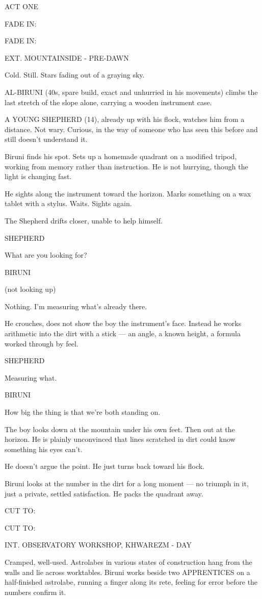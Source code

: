 \documentclass[12pt]{article}
\newcommand{\sceneheading}[1]{%
  \needspace{4\baselineskip}%
  \par\vspace{1\baselineskip}\noindent #1\par\vspace{0.6\baselineskip}%
}
\newcommand{\action}[1]{%
  \par\noindent #1\par\vspace{0.6\baselineskip}%
}
\newcommand{\transition}[1]{%
  \par\vspace{0.3\baselineskip}%
  \ifthenelse{\equal{#1}{FADE IN:}}%
    {\noindent #1\par}%
    {\noindent\hfill #1\par}%
  \vspace{0.6\baselineskip}%
}
\newcommand{\charcue}[1]{%
  \needspace{3\baselineskip}%
  \par\vspace{0.3\baselineskip}\noindent\hspace*{2.2in}#1\par%
}
\newenvironment{dialogue}{%
  \begin{list}{}{%
    \setlength{\leftmargin}{1.1in}%
    \setlength{\rightmargin}{1.6in}%
    \setlength{\listparindent}{0pt}%
    \setlength{\itemindent}{0pt}%
    \setlength{\parsep}{0pt}%
    \setlength{\itemsep}{0pt}%
    \setlength{\topsep}{0pt}%
  }\item[]%
}{%
  \end{list}\vspace{0.4\baselineskip}%
}
\newcommand{\parenthetical}[1]{%
  \hspace*{-0.4in}\hspace*{1.1in}(#1)\par%
}
\newcommand{\actbreak}[1]{%
  \clearpage\thispagestyle{plain}%
  \vspace*{2in}%
  \begin{center}#1\end{center}%
  \vspace{2\baselineskip}%
}
\begin{document}
\actbreak{ACT ONE}
\transition{FADE IN:}
\sceneheading{EXT. MOUNTAINSIDE - PRE-DAWN}
\action{Cold. Still. Stars fading out of a graying sky.}
\action{AL-BIRUNI (40s, spare build, exact and unhurried in his movements) climbs the last stretch of the slope alone, carrying a wooden instrument case.}
\action{A YOUNG SHEPHERD (14), already up with his flock, watches him from a distance. Not wary. Curious, in the way of someone who has seen this before and still doesn't understand it.}
\action{Biruni finds his spot. Sets up a homemade quadrant on a modified tripod, working from memory rather than instruction. He is not hurrying, though the light is changing fast.}
\action{He sights along the instrument toward the horizon. Marks something on a wax tablet with a stylus. Waits. Sights again.}
\action{The Shepherd drifts closer, unable to help himself.}
\charcue{SHEPHERD}
\begin{dialogue}
What are you looking for?\\
\end{dialogue}
\charcue{BIRUNI}
\begin{dialogue}
\parenthetical{not looking up}
Nothing. I'm measuring what's already there.\\
\end{dialogue}
\action{He crouches, does not show the boy the instrument's face. Instead he works arithmetic into the dirt with a stick --- an angle, a known height, a formula worked through by feel.}
\charcue{SHEPHERD}
\begin{dialogue}
Measuring what.\\
\end{dialogue}
\charcue{BIRUNI}
\begin{dialogue}
How big the thing is that we're both standing on.\\
\end{dialogue}
\action{The boy looks down at the mountain under his own feet. Then out at the horizon. He is plainly unconvinced that lines scratched in dirt could know something his eyes can't.}
\action{He doesn't argue the point. He just turns back toward his flock.}
\action{Biruni looks at the number in the dirt for a long moment --- no triumph in it, just a private, settled satisfaction. He packs the quadrant away.}
\transition{CUT TO:}
\sceneheading{INT. OBSERVATORY WORKSHOP, KHWAREZM - DAY}
\action{Cramped, well-used. Astrolabes in various states of construction hang from the walls and lie across worktables. Biruni works beside two APPRENTICES on a half-finished astrolabe, running a finger along its rete, feeling for error before the numbers confirm it.}
\end{document}
